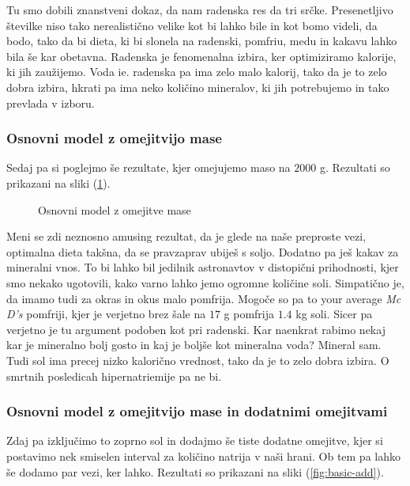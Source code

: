 \documentclass[a4paper]{article}
\begin{document}
Tu smo dobili znanstveni dokaz, da nam radenska res da tri srčke. Presenetljivo številke niso tako
nerealistično velike kot bi lahko bile in kot bomo videli, da bodo, tako da bi dieta, ki bi slonela
na radenski, pomfriu, medu in kakavu lahko bila še kar obetavna. Radenska je fenomenalna izbira, ker 
optimiziramo kalorije, ki jih zaužijemo. Voda ie. radenska pa ima zelo malo kalorij, tako da je to
zelo dobra izbira, hkrati pa ima neko količino mineralov, ki jih potrebujemo in tako prevlada v izboru.

\subsubsection{Osnovni model z omejitvijo mase}
Sedaj pa si poglejmo še rezultate, kjer omejujemo maso na $2000$ g. Rezultati so prikazani na 
sliki (\ref{fig:basic}). \\

\begin{figure}[H]
    \centering
    \caption{Osnovni model z omejitve mase}
    \label{fig:basic}
\end{figure}

Meni se zdi neznosno amusing rezultat, da je glede na naše preproste vezi, optimalna dieta takšna, da se
pravzaprav ubiješ s soljo. Dodatno pa ješ kakav za mineralni vnos. To bi lahko bil jedilnik astronavtov v 
distopični prihodnosti, kjer smo nekako ugotovili, kako varno lahko jemo ogromne količine soli. Simpatično je,
da imamo tudi za okras in okus malo pomfrija. Mogoče so pa to your average \textit{Mc D's} pomfriji, kjer je
verjetno brez šale na $17$ g pomfrija $1.4$ kg soli. Sicer pa verjetno je tu argument podoben kot pri radenski.
Kar naenkrat rabimo nekaj kar je mineralno bolj gosto in kaj je boljše kot mineralna voda? Mineral sam. Tudi sol 
ima precej nizko kalorično vrednost, tako da je to zelo dobra izbira. O smrtnih posledicah hipernatriemije pa
ne bi.

\subsubsection{Osnovni model z omejitvijo mase in dodatnimi omejitvami}
Zdaj pa izključimo to zoprno sol in dodajmo še tiste dodatne omejitve, kjer si postavimo nek smiselen interval
za količino natrija v naši hrani. Ob tem pa lahko še dodamo par vezi, ker lahko. Rezultati so prikazani na
sliki (\ref{fig:basic-add}). \\
\end{document}
